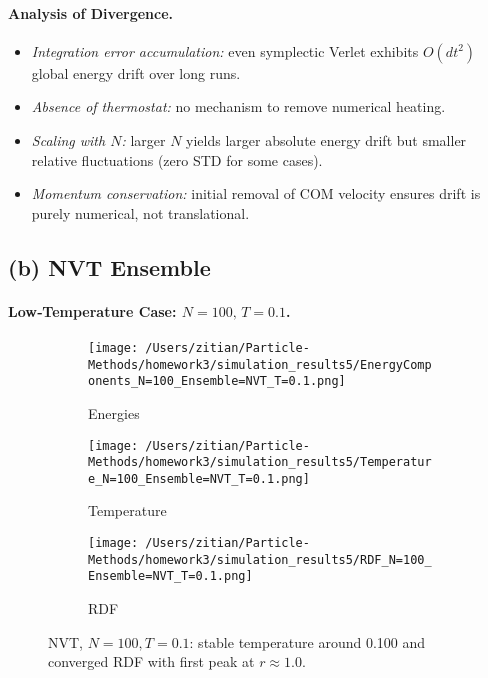\documentclass[11pt]{article}
\begin{document}
\paragraph{Analysis of Divergence.}
\begin{itemize}
  \item \emph{Integration error accumulation:} even symplectic Verlet exhibits $O(dt^2)$ global energy drift over long runs.
  \item \emph{Absence of thermostat:} no mechanism to remove numerical heating.
  \item \emph{Scaling with $N$:} larger $N$ yields larger absolute energy drift but smaller relative fluctuations (zero STD for some cases).
  \item \emph{Momentum conservation:} initial removal of COM velocity ensures drift is purely numerical, not translational.
\end{itemize}

\subsection{(b) NVT Ensemble}
\paragraph{Low‐Temperature Case: $N=100,\,T=0.1$.}
\begin{figure}[H]
  \centering
  \begin{subfigure}{0.32\textwidth}
    \texttt{[image: /Users/zitian/Particle-Methods/homework3/simulation\_results5/EnergyComponents\_N=100\_Ensemble=NVT\_T=0.1.png]}
    \caption{Energies}
  \end{subfigure}%
  \begin{subfigure}{0.32\textwidth}
    \texttt{[image: /Users/zitian/Particle-Methods/homework3/simulation\_results5/Temperature\_N=100\_Ensemble=NVT\_T=0.1.png]}
    \caption{Temperature}
  \end{subfigure}%
  \begin{subfigure}{0.32\textwidth}
    \texttt{[image: /Users/zitian/Particle-Methods/homework3/simulation\_results5/RDF\_N=100\_Ensemble=NVT\_T=0.1.png]}
    \caption{RDF}
  \end{subfigure}
  \caption{NVT, $N=100,T=0.1$: stable temperature around 0.100 and converged RDF with first peak at $r\approx1.0$.}
\end{figure}
\end{document}
